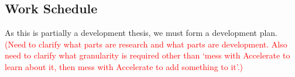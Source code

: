 \documentclass[a4paper,12pt]{article}
\newcommand{\red}[1]{\textcolor{red}{#1}}
\begin{document}
\begin{multicols}{2}
\section{Work Schedule}

As this is partially a development thesis, we must form a development plan. \red{(Need to clarify what parts are research and what parts are development. Also need to clarify what granularity is required other than `mess with Accelerate to learn about it, then mess with Accelerate to add something to it'.)}

\end{multicols}

\pagebreak

\footnotesize



\end{document}
